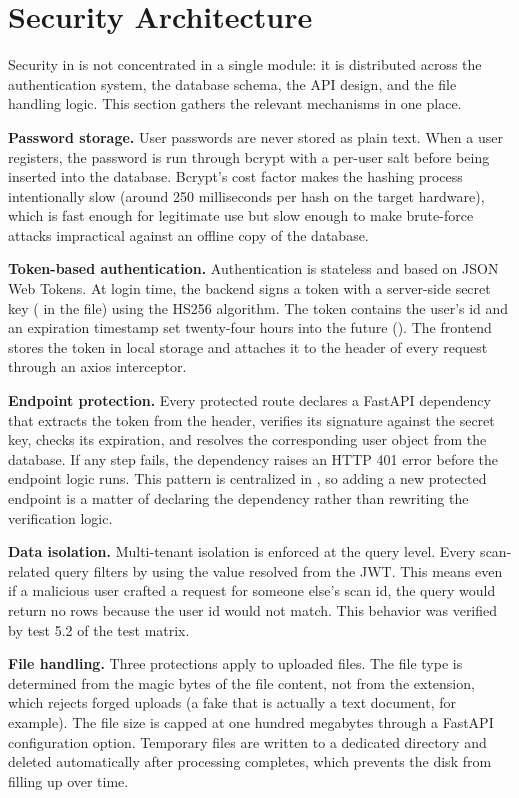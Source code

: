 \section{Security Architecture}

Security in \deepguard{} is not concentrated in a single module: it is distributed across the authentication system, the database schema, the API design, and the file handling logic. This section gathers the relevant mechanisms in one place.

\noindent\textbf{Password storage.} User passwords are never stored as plain text. When a user registers, the password is run through bcrypt with a per-user salt before being inserted into the database. Bcrypt's cost factor makes the hashing process intentionally slow (around 250 milliseconds per hash on the target hardware), which is fast enough for legitimate use but slow enough to make brute-force attacks impractical against an offline copy of the database.

\noindent\textbf{Token-based authentication.} Authentication is stateless and based on JSON Web Tokens. At login time, the backend signs a token with a server-side secret key ( in the  file) using the HS256 algorithm. The token contains the user's id and an expiration timestamp set twenty-four hours into the future (). The frontend stores the token in local storage and attaches it to the  header of every request through an axios interceptor.

\noindent\textbf{Endpoint protection.} Every protected route declares a FastAPI dependency that extracts the token from the header, verifies its signature against the secret key, checks its expiration, and resolves the corresponding user object from the database. If any step fails, the dependency raises an HTTP 401 error before the endpoint logic runs. This pattern is centralized in , so adding a new protected endpoint is a matter of declaring the dependency rather than rewriting the verification logic.

\noindent\textbf{Data isolation.} Multi-tenant isolation is enforced at the query level. Every scan-related query filters by  using the value resolved from the JWT. This means even if a malicious user crafted a request for someone else's scan id, the query would return no rows because the user id would not match. This behavior was verified by test 5.2 of the test matrix.

\noindent\textbf{File handling.} Three protections apply to uploaded files. The file type is determined from the magic bytes of the file content, not from the extension, which rejects forged uploads (a fake  that is actually a text document, for example). The file size is capped at one hundred megabytes through a FastAPI configuration option. Temporary files are written to a dedicated  directory and deleted automatically after processing completes, which prevents the disk from filling up over time.

